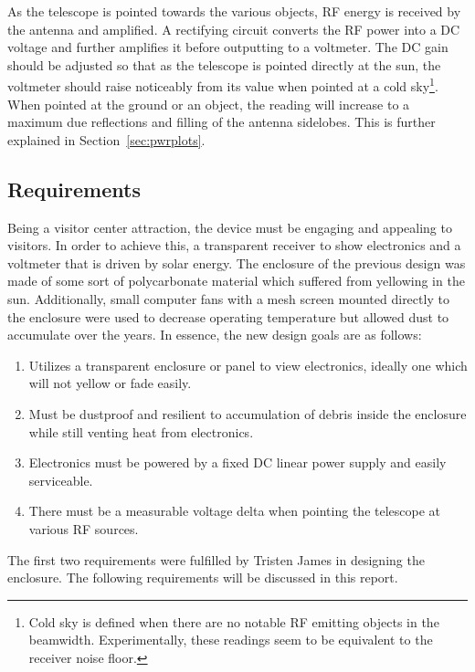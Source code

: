 \documentclass[titlepage]{article}
\begin{document}
As the telescope is pointed towards the various objects, RF energy is received by the antenna and amplified. A rectifying circuit converts the RF power into a DC voltage and further amplifies it before outputting to a voltmeter. The DC gain should be adjusted so that as the telescope is pointed directly at the sun, the voltmeter should raise noticeably from its value when pointed at a cold sky\footnote{Cold sky is defined when there are no notable RF emitting objects in the beamwidth. Experimentally, these readings seem to be equivalent to the receiver noise floor.}. When pointed at the ground or an object, the reading will increase to a maximum due reflections and filling of the antenna sidelobes. This is further explained in Section~\ref{sec:pwrplots}.

\subsection{Requirements}
Being a visitor center attraction, the device must be engaging and appealing to visitors. In order to achieve this, a transparent receiver to show electronics and a voltmeter that is driven by solar energy. The enclosure of the previous design was made of some sort of polycarbonate material which suffered from yellowing in the sun. Additionally, small computer fans with a mesh screen mounted directly to the enclosure were used to decrease operating temperature but allowed dust to accumulate over the years. In essence, the new design goals are as follows:
\begin{enumerate}
    \item Utilizes a transparent enclosure or panel to view electronics, ideally one which will not yellow or fade easily.
    \item Must be dustproof and resilient to accumulation of debris inside the enclosure while still venting heat from electronics.
    \item Electronics must be powered by a fixed DC linear power supply and easily serviceable.
    \item There must be a measurable voltage delta when pointing the telescope at various RF sources.
\end{enumerate}
The first two requirements were fulfilled by Tristen James in designing the enclosure. The following requirements will be discussed in this report.
\end{document}
